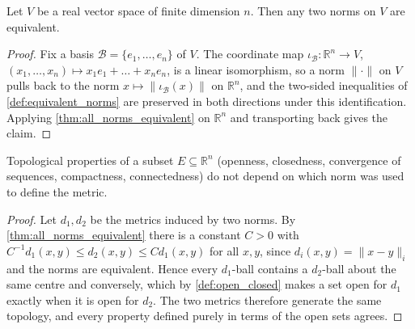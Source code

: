 \begin{corollary}
\label{cor:all_norms_equivalent_finite_dim}
Let $V$ be a real vector space of finite dimension $n$. Then any two norms on $V$ are equivalent.
\end{corollary}

\begin{proof}
Fix a basis $\mathcal{B} = \{e_1,\dots,e_n\}$ of $V$. The coordinate map
$\iota_{\mathcal{B}} : \mathbb{R}^n \to V$, $(x_1,\dots,x_n) \mapsto x_1e_1+\dots+x_ne_n$, is a
linear isomorphism, so a norm $\|\cdot\|$ on $V$ pulls back to the norm
$x \mapsto \|\iota_{\mathcal{B}}(x)\|$ on $\mathbb{R}^n$, and the two-sided inequalities of
\cref{def:equivalent_norms} are preserved in both directions under this identification. Applying
\cref{thm:all_norms_equivalent} on $\mathbb{R}^n$ and transporting back gives the claim.
\end{proof}

\begin{corollary}
\label{cor:norms_same_topology}
Topological properties of a subset $E \subseteq \mathbb{R}^n$ (openness, closedness, convergence
of sequences, compactness, connectedness) do not depend on which norm was used to define the
metric.
\end{corollary}

\begin{proof}
Let $d_1, d_2$ be the metrics induced by two norms. By \cref{thm:all_norms_equivalent} there is a
constant $C > 0$ with $C^{-1}d_1(x,y) \leq d_2(x,y) \leq Cd_1(x,y)$ for all $x,y$, since
$d_i(x,y) = \|x-y\|_i$ and the norms are equivalent. Hence every $d_1$-ball contains a
$d_2$-ball about the same centre and conversely, which by \cref{def:open_closed} makes a set open
for $d_1$ exactly when it is open for $d_2$. The two metrics therefore generate the same
topology, and every property defined purely in terms of the open sets agrees.
\end{proof}

